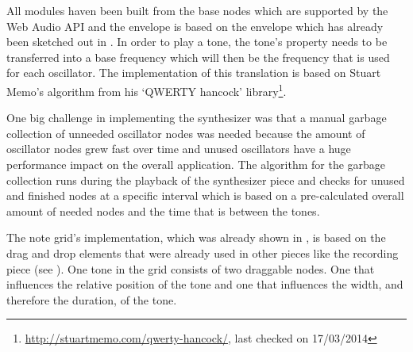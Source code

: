 All modules haven been built from the base nodes which are supported by the Web Audio API and the envelope is based on the envelope which has already been sketched out in . In order to play a tone, the tone's  property needs to be transferred into a base frequency which will then be the frequency that is used for each oscillator. The implementation of this translation is based on Stuart Memo's algorithm from his `QWERTY hancock' library\footnote{\url{http://stuartmemo.com/qwerty-hancock/}, last checked on 17/03/2014}.

One big challenge in implementing the synthesizer was that a manual garbage collection of unneeded oscillator nodes was needed because the amount of oscillator nodes grew fast over time and unused oscillators have a huge performance impact on the overall application. The algorithm for the garbage collection runs during the playback of the synthesizer piece and checks for unused and finished nodes at a specific interval which is based on a pre-calculated overall amount of needed nodes and the time that is between the tones.

The note grid's implementation, which was already shown in , is based on the drag and drop elements that were already used in other pieces like the recording piece (see ). One tone in the grid consists of two draggable nodes. One that influences the relative position of the tone and one that influences the width, and therefore the duration, of the tone.